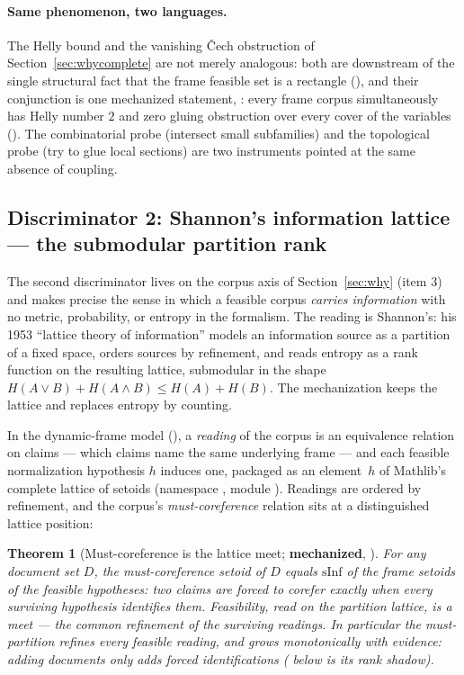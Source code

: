 \documentclass[11pt]{article}
\newtheorem{theorem}{Theorem}
\begin{document}
\paragraph{Same phenomenon, two languages.}  The Helly bound and
the vanishing \v{C}ech obstruction of
Section~\ref{sec:whycomplete} are not merely analogous: both are
downstream of the single structural fact that the frame feasible
set is a rectangle (), and
their conjunction is one mechanized statement,
: every frame corpus
simultaneously has Helly number $2$ and zero gluing obstruction
over every cover of the variables
().  The combinatorial probe
(intersect small subfamilies) and the topological probe (try to
glue local sections) are two instruments pointed at the same
absence of coupling.

\subsection{Discriminator 2: Shannon's information lattice --- the
submodular partition rank}
\label{sec:partitionrank}

The second discriminator lives on the corpus axis of
Section~\ref{sec:why} (item 3) and makes precise the sense in which
a feasible corpus \emph{carries information} with no metric,
probability, or entropy in the formalism.  The reading is
Shannon's: his 1953 ``lattice theory of information'' models an
information source as a partition of a fixed space, orders sources
by refinement, and reads entropy as a rank function on the
resulting lattice, submodular in the shape $H(A \vee B) + H(A
\wedge B) \le H(A) + H(B)$.  The mechanization keeps the lattice
and replaces entropy by counting.

In the dynamic-frame model (), a
\emph{reading} of the corpus is an equivalence relation on claims
--- which claims name the same underlying frame --- and each
feasible normalization hypothesis $h$ induces one, packaged as an
element $\,h$ of Mathlib's complete lattice of
setoids (namespace , module
).  Readings are ordered by refinement, and
the corpus's \emph{must-coreference} relation
sits at a distinguished lattice position:

\begin{theorem}[Must-coreference is the lattice meet;
\textbf{mechanized}, ]
\label{thm:mustmeet}
For any document set $D$, the must-coreference setoid of $D$ equals
$\mathrm{sInf}$ of the frame setoids of the feasible hypotheses:
two claims are forced to corefer exactly when \emph{every}
surviving hypothesis identifies them.  Feasibility, read on the
partition lattice, is a meet --- the common refinement of the
surviving readings.  In particular the must-partition refines every
feasible reading, and grows monotonically with evidence: adding
documents only adds forced identifications
( below is its rank shadow).
\end{theorem}
\end{document}
